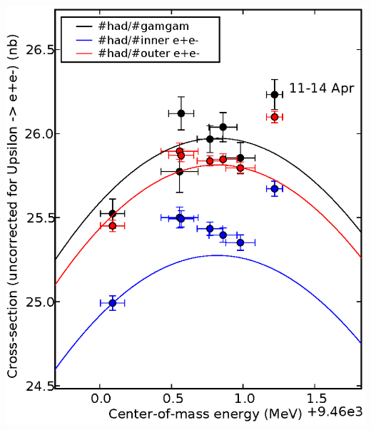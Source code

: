 \documentclass[12pt]{article}
\begin{document}
\setlength{\parindent}{0 cm}

\begin{center}
  \includegraphics[width=0.9\linewidth]{stability2_thecorrections.eps}
\end{center}
\end{document}
